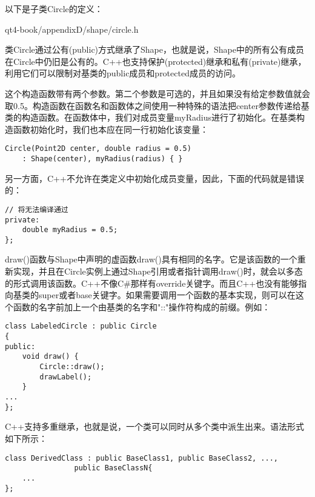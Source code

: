 \documentclass[11pt,oneside]{book}
\begin{document}
\begin{common-format}
以下是子类Circle的定义：

\begin{cppinput}{qt4-book/appendixD/shape/circle.h}
\end{cppinput}

类Circle通过公有(public)方式继承了Shape，也就是说，Shape中的所有公有成员在Circle中仍旧是公有的。C++也支持保护(protected)继承和私有(private)继承，利用它们可以限制对基类的public成员和protected成员的访问。

这个构造函数带有两个参数。第二个参数是可选的，并且如果没有给定参数值就会取0.5。构造函数在函数名和函数体之间使用一种特殊的语法把center参数传递给基类的构造函数。在函数体中，我们对成员变量myRadius进行了初始化。在基类构造函数初始化时，我们也本应在同一行初始化该变量：
\begin{Verbatim}
Circle(Point2D center, double radius = 0.5)
    : Shape(center), myRadius(radius) { }
\end{Verbatim}

另一方面，C++不允许在类定义中初始化成员变量，因此，下面的代码就是错误的：
\begin{Verbatim}
// 将无法编译通过
private:
    double myRadius = 0.5;
};
\end{Verbatim}

draw()函数与Shape中声明的虚函数draw()具有相同的名字。它是该函数的一个重新实现，并且在Circle实例上通过Shape引用或者指针调用draw()时，就会以多态的形式调用该函数。C++不像C\#{}那样有override关键字。而且C++也没有能够指向基类的super或者base关键字。如果需要调用一个函数的基本实现，则可以在这个函数的名字前加上一个由基类的名字和"::"操作符构成的前缀。例如：
\begin{Verbatim}
class LabeledCircle : public Circle
{
public:
    void draw() {
        Circle::draw();
        drawLabel();
    }
...
};
\end{Verbatim}


C++支持多重继承，也就是说，一个类可以同时从多个类中派生出来。语法形式如下所示：
\begin{Verbatim}
class DerivedClass : public BaseClass1, public BaseClass2, ...,
                public BaseClassN{
    ...
};
\end{Verbatim}






\end{common-format}
\end{document}

